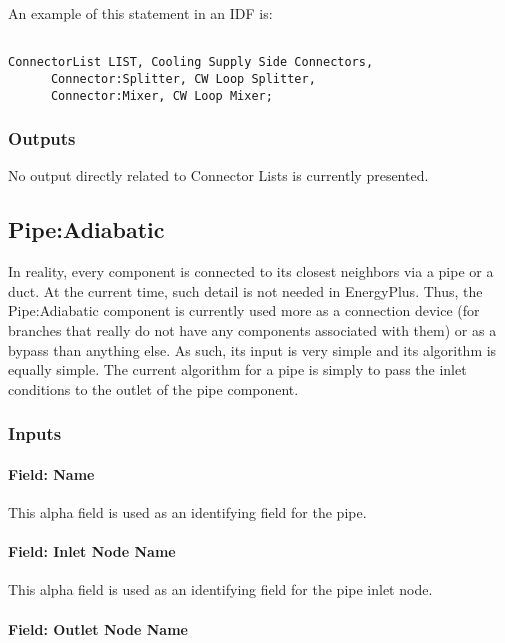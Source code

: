 An example of this statement in an IDF is:

\begin{lstlisting}

ConnectorList LIST, Cooling Supply Side Connectors,
      Connector:Splitter, CW Loop Splitter,
      Connector:Mixer, CW Loop Mixer;
\end{lstlisting}

\subsubsection{Outputs}\label{outputs-3-012}

No output directly related to Connector Lists is currently presented.

\subsection{Pipe:Adiabatic}\label{pipeadiabatic}

In reality, every component is connected to its closest neighbors via a pipe or a duct. At the current time, such detail is not needed in EnergyPlus. Thus, the Pipe:Adiabatic component is currently used more as a connection device (for branches that really do not have any components associated with them) or as a bypass than anything else. As such, its input is very simple and its algorithm is equally simple. The current algorithm for a pipe is simply to pass the inlet conditions to the outlet of the pipe component.

\subsubsection{Inputs}\label{inputs-4-019}

\paragraph{Field: Name}\label{field-name-4-016}

This alpha field is used as an identifying field for the pipe.

\paragraph{Field: Inlet Node Name}\label{field-inlet-node-name-001}

This alpha field is used as an identifying field for the pipe inlet node.

\paragraph{Field: Outlet Node Name}\label{field-outlet-node-name-002}

